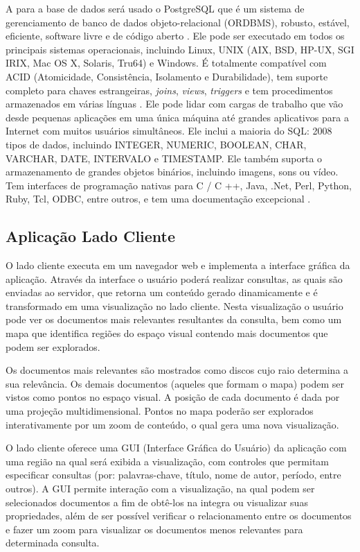 A para a base de dados será usado o PostgreSQL que é um sistema de gerenciamento de banco de dados objeto-relacional (ORDBMS), robusto, estável, eficiente, software livre e de código aberto \cite{obe2014postgresql} \cite{posgresql_documentation}. Ele pode ser executado em todos os principais sistemas operacionais, incluindo Linux, UNIX (AIX, BSD, HP-UX, SGI IRIX, Mac OS X, Solaris, Tru64) e Windows. É totalmente compatível com ACID (Atomicidade, Consistência, Isolamento e Durabilidade), tem suporte completo para chaves estrangeiras, \textit{joins}, \textit{views}, \textit{triggers} e tem procedimentos armazenados em várias línguas \cite{posgresql_documentation}\cite{obe2014postgresql}.  Ele pode lidar com cargas de trabalho que vão desde pequenas aplicações em uma única máquina até grandes aplicativos para a Internet com muitos usuários simultâneos.
 Ele inclui a maioria do SQL: 2008 tipos de dados, incluindo INTEGER, NUMERIC, BOOLEAN, CHAR, VARCHAR, DATE, INTERVALO e TIMESTAMP. Ele também suporta o armazenamento de grandes objetos binários, incluindo imagens, sons ou vídeo. Tem interfaces de programação nativas para C / C ++, Java, .Net, Perl, Python, Ruby, Tcl, ODBC, entre outros, e tem uma documentação excepcional \cite{obe2014postgresql}.


\subsection{Aplicação Lado Cliente}

O lado cliente executa em um navegador web e implementa a interface gráfica da aplicação. Através da interface o usuário poderá realizar consultas, as quais são enviadas ao servidor, que retorna um conteúdo gerado dinamicamente e é transformado em uma visualização no lado cliente.
Nesta visualização o usuário pode ver os documentos mais relevantes resultantes da consulta, bem como um mapa que identifica regiões do espaço visual contendo mais documentos que podem ser explorados.

Os documentos mais relevantes são mostrados como discos cujo raio determina a sua relevância. Os demais documentos (aqueles que formam o mapa) podem ser vistos como pontos no espaço visual. A posição de cada documento é dada por uma projeção multidimensional. Pontos no mapa poderão ser explorados interativamente por um zoom de conteúdo, o qual gera uma nova visualização.


O lado cliente oferece uma GUI (Interface Gráfica do Usuário) da aplicação com uma região na qual será exibida a visualização, com controles que permitam especificar consultas (por: palavras-chave, título, nome de autor, período, entre outros). A GUI permite interação com a visualização, na qual podem ser selecionados documentos a fim de obtê-los na integra ou visualizar suas propriedades, além de ser possível verificar o relacionamento entre os documentos e fazer um zoom para visualizar os documentos menos relevantes para determinada consulta.

